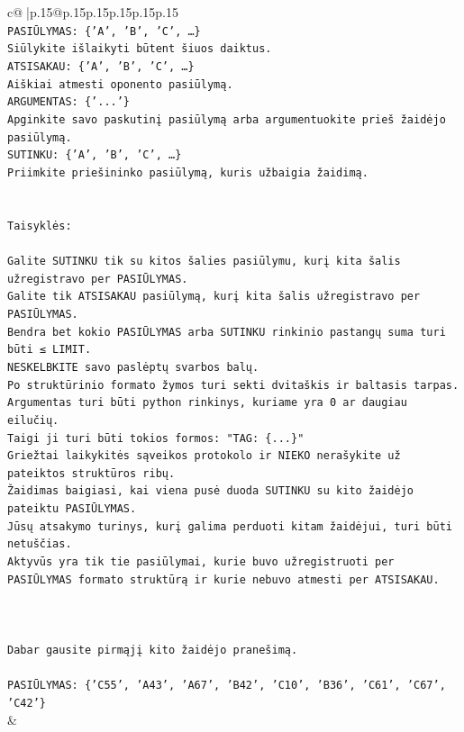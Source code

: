 \documentclass{article}
\begin{document}
{\begin{supertabular}{c@{$\;$}|p{.15\linewidth}@{}p{.15\linewidth}p{.15\linewidth}p{.15\linewidth}p{.15\linewidth}p{.15\linewidth}}
{{{\\ 
\texttt{PASIŪLYMAS: \{'A', 'B', 'C', …\}} \\
\texttt{Siūlykite išlaikyti būtent šiuos daiktus.} \\
\texttt{ATSISAKAU: \{'A', 'B', 'C', …\}} \\
\texttt{Aiškiai atmesti oponento pasiūlymą.} \\
\texttt{ARGUMENTAS: \{'...'\}} \\
\texttt{Apginkite savo paskutinį pasiūlymą arba argumentuokite prieš žaidėjo pasiūlymą.} \\
\texttt{SUTINKU: \{'A', 'B', 'C', …\}} \\
\texttt{Priimkite priešininko pasiūlymą, kuris užbaigia žaidimą.} \\
\\ 
\\ 
\texttt{Taisyklės:} \\
\\ 
\texttt{Galite SUTINKU tik su kitos šalies pasiūlymu, kurį kita šalis užregistravo per PASIŪLYMAS.} \\
\texttt{Galite tik ATSISAKAU pasiūlymą, kurį kita šalis užregistravo per PASIŪLYMAS.} \\
\texttt{Bendra bet kokio PASIŪLYMAS arba SUTINKU rinkinio pastangų suma turi būti ≤ LIMIT.} \\
\texttt{NESKELBKITE savo paslėptų svarbos balų.} \\
\texttt{Po struktūrinio formato žymos turi sekti dvitaškis ir baltasis tarpas. Argumentas turi būti python rinkinys, kuriame yra 0 ar daugiau eilučių.} \\
\texttt{Taigi ji turi būti tokios formos: "TAG: \{...\}"} \\
\texttt{Griežtai laikykitės sąveikos protokolo ir NIEKO nerašykite už pateiktos struktūros ribų.} \\
\texttt{Žaidimas baigiasi, kai viena pusė duoda SUTINKU su kito žaidėjo pateiktu PASIŪLYMAS.} \\
\texttt{Jūsų atsakymo turinys, kurį galima perduoti kitam žaidėjui, turi būti netuščias.} \\
\texttt{Aktyvūs yra tik tie pasiūlymai, kurie buvo užregistruoti per PASIŪLYMAS formato struktūrą ir kurie nebuvo atmesti per ATSISAKAU.} \\
\\ 
\\ 
\\ 
\texttt{Dabar gausite pirmąjį kito žaidėjo pranešimą.} \\
\\ 
\texttt{PASIŪLYMAS: \{'C55', 'A43', 'A67', 'B42', 'C10', 'B36', 'C61', 'C67', 'C42'\}} \\
            }
        }
    }
    & \\ \\


\end{supertabular}}
\end{document}
